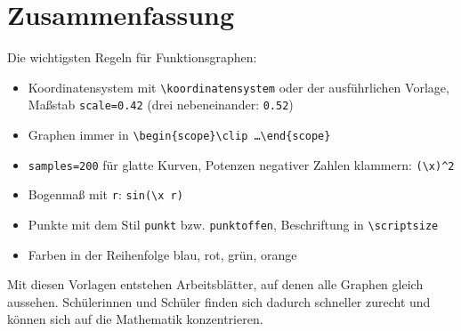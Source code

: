 \begin{ausgabe}
\centering
{}
\end{ausgabe}



\section{Zusammenfassung}

Die wichtigsten Regeln für Funktionsgraphen:

\begin{itemize}
	\item Koordinatensystem mit \texttt{\textbackslash koordinatensystem} oder der ausführlichen Vorlage, Maßstab \texttt{scale=0.42} (drei nebeneinander: \texttt{0.52})
	\item Graphen immer in \texttt{\textbackslash begin\{scope\}\textbackslash clip \dots\textbackslash end\{scope\}}
	\item \texttt{samples=200} für glatte Kurven, Potenzen negativer Zahlen klammern: \texttt{(\textbackslash x)\^{}2}
	\item Bogenmaß mit \texttt{r}: \texttt{sin(\textbackslash x r)}
	\item Punkte mit dem Stil \texttt{punkt} bzw. \texttt{punktoffen}, Beschriftung in \texttt{\textbackslash scriptsize}
	\item Farben in der Reihenfolge blau, rot, grün, orange
\end{itemize}

Mit diesen Vorlagen entstehen Arbeitsblätter, auf denen alle Graphen gleich aussehen. Schülerinnen und Schüler finden sich dadurch schneller zurecht und können sich auf die Mathematik konzentrieren.



